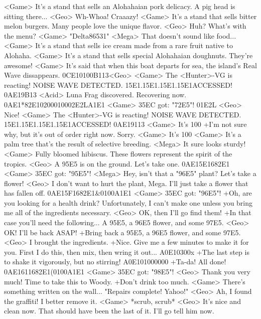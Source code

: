 <Game> It's a stand that sells an Alohahaian pork delicacy. A pig head is sitting there... 
<Geo> Wh-Whoa! Craaazy! 
<Game> It's a stand that sells bitter melon burgers. Many people love the unique flavor. 
<Geo> Huh? What's with the menu? 
<Game>   "Delta86531" 
<Mega> That doesn't sound like food... 
<Game> It's a stand that sells ice cream made from a rare fruit native to Alohaha. 
<Game> It's a stand that sells special Alohahaian doughnuts. They're awesome! 
<Game> It's said that when this boat departs for sea, the island's Real Wave dissappears. 
{0C}{E1}{01}{00}{B1}{13}<Geo>
<Game> The <Hunter>-VG is reacting! 
NOISE WAVE DETECTED. {15}{E1}.{15}{E1}.{15}{E1}.{15}{E1}ACCESSED! 
{0A}{E1}{9B}{13}
<Acid> Luna Frag discovered. Recovering now. 
{0A}{E1}*{82}{E1}{02}{00}{01}{00}{02}{E2}L{A1}{E1} 
<Game> {35}{EC} got: "{72}{E5}"! 
{01}{E2}L 
<Geo> Nice! 
<Game> The <Hunter>-VG is reacting! 
NOISE WAVE DETECTED. {15}{E1}.{15}{E1}.{15}{E1}.{15}{E1}ACCESSED! 
{0A}{E1}{91}{13}
<Game> It's 100%
+I'm not sure why, but it's out of order right now. 
Sorry. 
<Game> It's 100%
<Game> It's a palm tree that's the result of selective breeding. 
<Mega> It sure looks sturdy! 
<Game> Fully bloomed hibiscus. These flowers represent the spirit of the tropics. 
<Geo> A {95}{E5} is on the ground. Let's take one. 
{0A}{E1}{5E}{16}{82}{E1}%
<Game> {35}{EC} got: "{95}{E5}"! 
<Mega> Hey, isn't that a "{96}{E5}" plant? Let's take a flower! 
<Geo> I don't want to hurt the plant, Mega. I'll just take a flower that has fallen off. 
{0A}{E1}{5F}{16}{82}{E1}&{01}{00}{A1}{E1} 
<Game> {35}{EC} got: "{96}{E5}"! 
+Oh, are you looking for a health drink? 
Unfortunately, I can't make one unless you bring me all of the ingredients necessary. 
<Geo> OK, then I'll go find them! 
+In that case you'll need the following... 
A {95}{E5}, a {96}{E5} flower, and some {97}{E5}. 
<Geo> OK! I'll be back ASAP! 
+Bring back a {95}{E5}, a {96}{E5} flower, and some {97}{E5}. 
<Geo> I brought the ingredients. 
+Nice. Give me a few minutes to make it for you. 
First I do this, then mix, then wring it out... 
{A0}{E1}{03}{00}x 
+The last step is to shake it vigorously, but no stirring! 
{A0}{E1}{01}{00}{00}{00} 
+Ta-da! All done! 
{0A}{E1}{61}{16}{82}{E1}({01}{00}{A1}{E1} 
<Game> {35}{EC} got: "{98}{E5}"! 
<Geo> Thank you very much! 
Time to take this to Woody. 
+Don't drink too much. 
<Game> There's something written on the wall... 
"Repairs complete! Yahoo!" 
<Geo> Ah, I found the graffiti! I better remove it. 
<Game> *scrub, scrub* 
<Geo> It's nice and clean now. That should have been the last of it. I'll go tell him now. 

